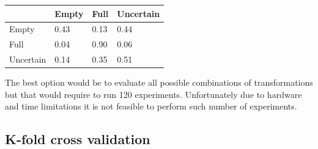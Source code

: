 \documentclass[a4paper, 11pt, table]{article}
\begin{document}
\begin{center}
\label{table:zoom_only}
\begin{tabular}{|L{2.5cm} |C{2.5cm} |C{2.5cm} |C{2.5cm}|}
\toprule
 & Empty & Full & Uncertain \\
\midrule
Empty & 0.43 & 0.13 & 0.44 \\
Full & 0.04 & 0.90 & 0.06 \\
Uncertain & 0.14 & 0.35 & 0.51 \\
\bottomrule
\end{tabular}
\end{center}

The best option would be to evaluate all possible combinations of transformations but that would require to run 120 experiments. Unfortunately due to hardware and time limitations it is not feasible to perform such number of experiments.

\subsection{K-fold cross validation}
\end{document}
